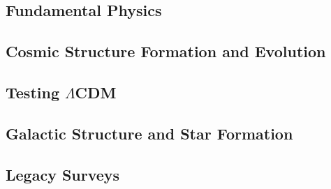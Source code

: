 \documentclass[12pt]{article}
\begin{document}








\subsection{Fundamental Physics} %
\label{sec:fundamentalsci}





\subsection{Cosmic Structure Formation and Evolution} %
\label{sec:extragalacticsci}



\subsection{Testing $\Lambda$CDM} %
\label{sec:testinglcdm}




\subsection{Galactic Structure and Star Formation} %
\label{sec:galacticsci}



\subsection{Legacy Surveys} %
\label{sec:legacy}

%



\end{document}
